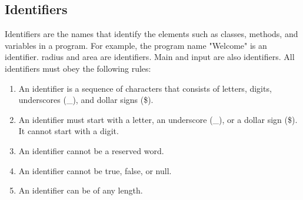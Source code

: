 \documentclass[11pt,a4 paper]{book}
\theoremstyle{plain}
\theoremstyle{definition}
\theoremstyle{remark}
\begin{document}
\begin{flushleft}
\section{Identifiers}
Identifiers are the names that identify the elements such as classes, methods, and variables in a program. For example, the program name "Welcome" is an identifier. radius and area are identifiers. Main and input are also identifiers. All identifiers must obey the following rules:
\begin{enumerate}
\item An identifier is a sequence of characters that consists of letters, digits, underscores (\_), and dollar signs (\$).
\item An identifier must start with a letter, an underscore (\_), or a dollar sign (\$). It cannot start with a digit.
\item An identifier cannot be a reserved word.
\item An identifier cannot be true, false, or null.
\item An identifier can be of any length.
\end{enumerate}

\end{flushleft}
\end{document}
